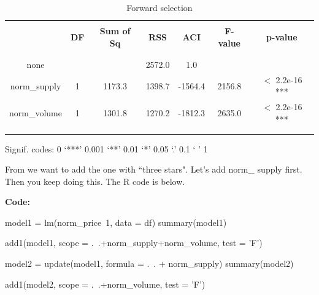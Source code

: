 \documentclass[12pt]{article}
\begin{document}
\begin{table}[h!]
\begin{center}
	
\begin{threeparttable}
		\caption{Forward selection}			
\begin{tabular}{ccccccc}
\\ [-1.8ex]
\hline
\hline

\hline \\[-1.8ex]
 & {\textbf {DF}} & {\textbf {Sum of Sq}} &{\textbf {RSS}}&
{\textbf {ACI}} & {\textbf {F-value}} & {\textbf {p-value}} \\
\\ [-1.8ex]
\hline \\[-1.8ex]

none       &     &       &2572.0 & 1.0     &       & \\
norm\_supply  &1    &1173.3 &1398.7 &-1564.4  &2156.8 &$<$ 2.2e-16 ***\\
norm\_volume  &1    &1301.8 &1270.2 &-1812.3  &2635.0 &$<$ 2.2e-16 ***\\


\\ [-1.8ex]
\hline \\[-1.8ex]

\end{tabular}
\begin{tablenotes}
\small
\item Signif. codes:  0 ‘***’ 0.001 ‘**’ 0.01 ‘*’ 0.05 ‘.’ 0.1 ‘ ’ 1
\end{tablenotes}

\end{threeparttable}
\end{center}
\end{table}


From we want to add the one with ``three stars". Let's add norm\_
supply first. Then you keep doing this. The R code is below.


{\textbf {Code:}}
\begin{rc}
model1 = lm(norm\_price~1, data = df)
summary(model1)

add1(model1, scope = .~.+norm\_supply+norm\_volume, test = 'F')

model2 = update(model1, formula = .~. + norm\_supply)
summary(model2)

add1(model2, scope = .~.+norm\_volume, test = 'F')
\end{rc}
\end{document}
